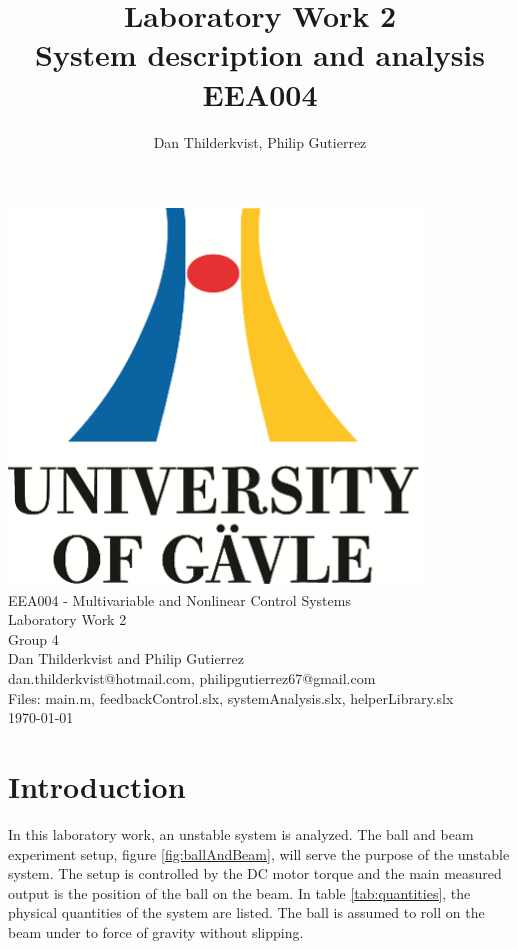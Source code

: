 \documentclass[a4paper, titlepage]{article}
\title{Laboratory Work 2\\
System description and analysis\\
\large EEA004}
\author{Dan Thilderkvist, Philip Gutierrez}
\begin{document}
\begin{titlepage}
\begin{center}
\vspace*{1cm}
\includegraphics[scale=1.0]{../figures/hig_logo_eng.png}\\
\vspace{1.5cm}
\large EEA004 - Multivariable and Nonlinear Control Systems\\
\large Laboratory Work 2\\
\vspace{1.5cm}
Group 4\\
Dan Thilderkvist and Philip Gutierrez\\
dan.thilderkvist@hotmail.com, philipgutierrez67@gmail.com\\
Files: main.m, feedbackControl.slx, systemAnalysis.slx, helperLibrary.slx\\
\vspace{1cm}
\today
\end{center}
\end{titlepage}

\tableofcontents
\clearpage

\section{Introduction}
In this laboratory work, an unstable system is analyzed.
The ball and beam experiment setup, figure \ref{fig:ballAndBeam}, will serve the purpose of the unstable system.
The setup is controlled by the DC motor torque and the main measured output is the position of the ball on the beam.
In table \ref{tab:quantities}, the physical quantities of the system are listed.
The ball is assumed to roll on the beam under to force of gravity without slipping.
\end{document}
